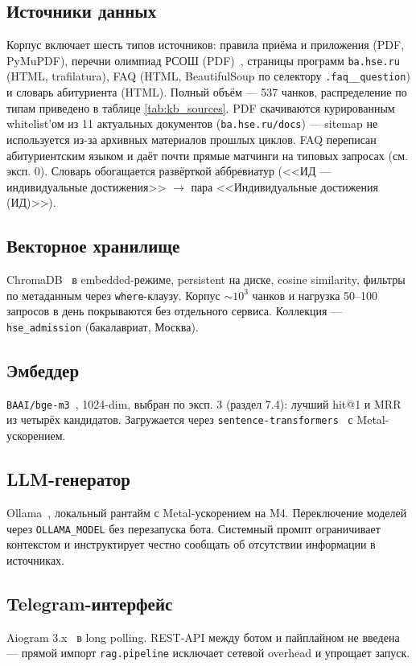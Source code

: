 \documentclass[a4paper,12pt]{extarticle}
\begin{document}
\subsection{Источники данных}
Корпус включает шесть типов источников: правила приёма и приложения (PDF, PyMuPDF), перечни олимпиад РСОШ (PDF)~\cite{rsosh}, страницы программ \texttt{ba.hse.ru}~\cite{hsebachelor} (HTML, trafilatura), FAQ (HTML, BeautifulSoup по селектору \texttt{.faq\_\_question}) и словарь абитуриента (HTML). Полный объём --- 537 чанков, распределение по типам приведено в таблице \ref{tab:kb_sources}. PDF скачиваются курированным whitelist'ом из 11 актуальных документов (\texttt{ba.hse.ru/docs}) --- sitemap не используется из-за архивных материалов прошлых циклов. FAQ переписан абитуриентским языком и даёт почти прямые матчинги на типовых запросах (см. эксп. 0). Словарь обогащается развёрткой аббревиатур (<<ИД --- индивидуальные достижения>> $\rightarrow$ пара <<Индивидуальные достижения (ИД)>>).

\subsection{Векторное хранилище}
ChromaDB~\cite{chromadb} в embedded-режиме, persistent на диске, cosine similarity, фильтры по метаданным через \texttt{where}-клаузу. Корпус $\sim 10^3$ чанков и нагрузка 50--100 запросов в день покрываются без отдельного сервиса. Коллекция --- \texttt{hse\_admission} (бакалавриат, Москва).

\subsection{Эмбеддер}
\texttt{BAAI/bge-m3}~\cite{bgem3}, 1024-dim, выбран по эксп. 3 (раздел 7.4): лучший hit@1 и MRR из четырёх кандидатов. Загружается через \texttt{sentence-transformers}~\cite{sentencetransformers} с Metal-ускорением.

\subsection{LLM-генератор}
Ollama~\cite{ollama}, локальный рантайм с Metal-ускорением на M4. Переключение моделей через \texttt{OLLAMA\_MODEL} без перезапуска бота. Системный промпт ограничивает контекстом и инструктирует честно сообщать об отсутствии информации в источниках.

\subsection{Telegram-интерфейс}
Aiogram 3.x~\cite{aiogram} в long polling. REST-API между ботом и пайплайном не введена --- прямой импорт \texttt{rag.pipeline} исключает сетевой overhead и упрощает запуск.
\end{document}
